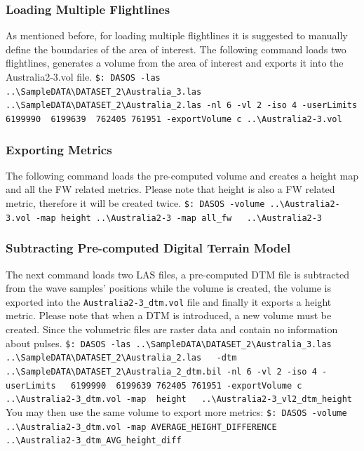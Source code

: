 \documentclass{article}
\begin{document}
		\subsubsection{Loading Multiple Flightlines}
		As mentioned before, for loading multiple flightlines it is suggested to manually define the boundaries of the area of interest. The following command loads two flightlines, generates a volume from the area of interest and exports it into the Australia2-3.vol file.
		\newline\newline
		\verb|$: DASOS -las ..\SampleDATA\DATASET_2\Australia_3.las|\newline \verb|   ..\SampleDATA\DATASET_2\Australia_2.las -nl 6 -vl 2 -iso 4 -userLimits 6199990 |\newline \verb| 6199639  762405 761951 -exportVolume c ..\Australia2-3.vol|
		
		\subsubsection{Exporting Metrics}
		The following command loads the pre-computed volume and creates a height map and all the FW related metrics. Please note that height is also a FW related metric, therefore it will be created twice. \newline
		\verb|$: DASOS -volume ..\Australia2-3.vol -map height ..\Australia2-3 -map all_fw|\newline \verb|   ..\Australia2-3|
		
		\subsubsection{Subtracting Pre-computed Digital Terrain Model}
		The next command loads two LAS files, a pre-computed DTM file is subtracted from the wave samples' positions while the volume is created, the volume is exported into the \verb|Australia2-3_dtm.vol| file and finally it exports a height metric.\newline
		Please note that when a DTM is introduced, a new volume must be created. Since the volumetric files are raster data and contain no information about pulses.
		\newline\newline 		
		\verb|$: DASOS -las ..\SampleDATA\DATASET_2\Australia_3.las|\newline \verb|  ..\SampleDATA\DATASET_2\Australia_2.las   -dtm |\newline \verb| ..\SampleDATA\DATASET_2\Australia_2_dtm.bil -nl 6 -vl 2 -iso 4 -userLimits  |\newline \verb| 6199990  6199639 762405 761951 -exportVolume c ..\Australia2-3_dtm.vol -map |\newline \verb| height   ..\Australia2-3_vl2_dtm_height|
		\newline\newline
		You may then use the same volume to export more metrics:\newline
		\verb|$: DASOS -volume ..\Australia2-3_dtm.vol -map AVERAGE_HEIGHT_DIFFERENCE |\newline \verb|   ..\Australia2-3_dtm_AVG_height_diff|
		
\end{document}
